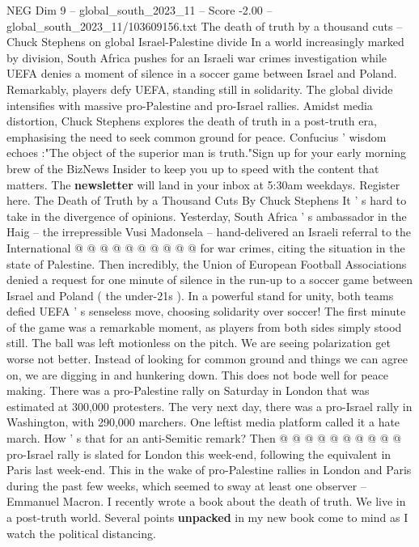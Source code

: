 \begin{textsample}{NEG Dim 9 – global\_south\_2023\_11 – Score -2.00 – global\_south\_2023\_11/103609156.txt}  \label{ex:f9_neg_430}
The death of truth by a thousand cuts -- Chuck Stephens on global Israel-Palestine divide In a world increasingly marked by division, South Africa pushes for an Israeli war crimes investigation while UEFA denies a moment of silence in a soccer game between Israel and Poland.
Remarkably, players defy UEFA, standing still in solidarity.
The global divide intensifies with massive pro-Palestine and pro-Israel rallies.
Amidst media distortion, Chuck Stephens explores the death of truth in a post-truth era, emphasising the need to seek common ground for peace.
Confucius ' wisdom echoes :"The object of the superior man is truth."Sign up for your early morning brew of the BizNews Insider to keep you up to speed with the content that matters.
The \textbf{newsletter} will land in your inbox at 5:30am weekdays.
Register here.
The Death of Truth by a Thousand Cuts By Chuck Stephens It ' s hard to take in the divergence of opinions.
Yesterday, South Africa ' s ambassador in the Haig -- the irrepressible Vusi Madonsela -- hand-delivered an Israeli referral to the International @ @ @ @ @ @ @ @ @ @ for war crimes, citing the situation in the state of Palestine.
Then incredibly, the Union of European Football Associations denied a request for one minute of silence in the run-up to a soccer game between Israel and Poland ( the under-21s ).
In a powerful stand for unity, both teams defied UEFA ' s senseless move, choosing solidarity over soccer!
The first minute of the game was a remarkable moment, as players from both sides simply stood still.
The ball was left motionless on the pitch.
We are seeing polarization get worse not better.
Instead of looking for common ground and things we can agree on, we are digging in and hunkering down.
This does not bode well for peace making.
There was a pro-Palestine rally on Saturday in London that was estimated at 300,000 protesters.
The very next day, there was a pro-Israel rally in Washington, with 290,000 marchers.
One leftist media platform called it a hate march.
How ' s that for an anti-Semitic remark?
Then @ @ @ @ @ @ @ @ @ @ pro-Israel rally is slated for London this week-end, following the equivalent in Paris last week-end.
This in the wake of pro-Palestine rallies in London and Paris during the past few weeks, which seemed to sway at least one observer -- Emmanuel Macron.
I recently wrote a book about the death of truth.
We live in a post-truth world.
Several points \textbf{unpacked} in my new book come to mind as I watch the political distancing.

\end{textsample}
